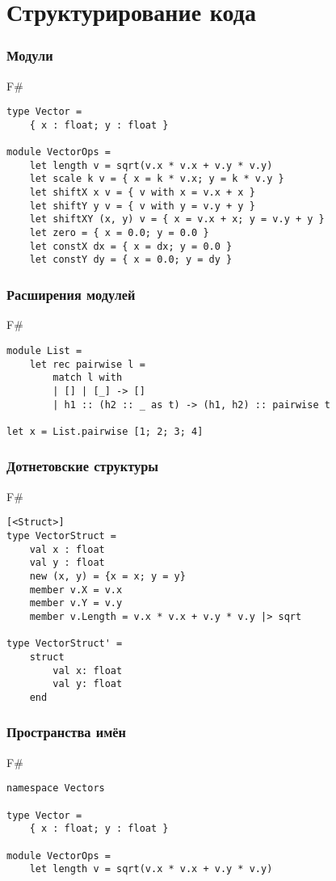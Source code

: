 \documentclass[xetex,mathserif,serif]{beamer}
\begin{document}
    \section{Структурирование кода}
  
   	\begin{frame}[fragile]
   		\frametitle{Модули}
   		\begin{exampleblock}{F\#}
   			\begin{lstlisting}
type Vector =
    { x : float; y : float }

module VectorOps =
    let length v = sqrt(v.x * v.x + v.y * v.y)
    let scale k v = { x = k * v.x; y = k * v.y }
    let shiftX x v = { v with x = v.x + x }
    let shiftY y v = { v with y = v.y + y }
    let shiftXY (x, y) v = { x = v.x + x; y = v.y + y }
    let zero = { x = 0.0; y = 0.0 }
    let constX dx = { x = dx; y = 0.0 }
    let constY dy = { x = 0.0; y = dy }
\end{lstlisting}
\end{exampleblock}
\end{frame}    

   	\begin{frame}[fragile]
   		\frametitle{Расширения модулей}
   		\begin{exampleblock}{F\#}
   			\begin{lstlisting}
module List =
    let rec pairwise l =
        match l with
        | [] | [_] -> []
        | h1 :: (h2 :: _ as t) -> (h1, h2) :: pairwise t

let x = List.pairwise [1; 2; 3; 4]
\end{lstlisting}
\end{exampleblock}
\end{frame}   

   	\begin{frame}[fragile]
   		\frametitle{Дотнетовские структуры}
   		\begin{exampleblock}{F\#}
   			\begin{lstlisting}
[<Struct>]
type VectorStruct =
    val x : float
    val y : float
    new (x, y) = {x = x; y = y}
    member v.X = v.x
    member v.Y = v.y
    member v.Length = v.x * v.x + v.y * v.y |> sqrt

type VectorStruct' =
    struct
        val x: float
        val y: float
    end
\end{lstlisting}
\end{exampleblock}
\end{frame}   

   	\begin{frame}[fragile]
   		\frametitle{Пространства имён}
   		\begin{exampleblock}{F\#}
   			\begin{lstlisting}
namespace Vectors

type Vector =
    { x : float; y : float }

module VectorOps =
    let length v = sqrt(v.x * v.x + v.y * v.y)
\end{lstlisting}
\end{exampleblock}
\end{frame}  
\end{document}
